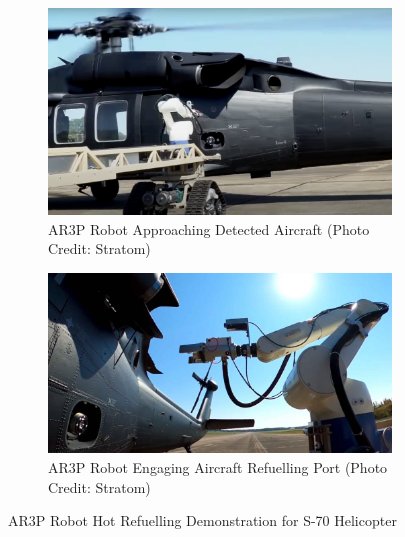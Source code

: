 \documentclass[12pt,oneside]{book} %
\begin{document}
\begin{figure}[H]
    \centering
    \begin{subfigure}[b]{0.45\textwidth}
        \includegraphics[height=0.68\textwidth, width=\textwidth]{figures/test_2020_2.png}
        \caption{AR3P Robot Approaching Detected Aircraft (Photo Credit: Stratom)}\label{test-2020-2}
    \end{subfigure}
    \hfill
    \begin{subfigure}[b]{0.45\textwidth}
        \includegraphics[height=0.68\textwidth, width=\textwidth]{figures/test_2020_3.jpg}
        \caption{AR3P Robot Engaging Aircraft Refuelling Port (Photo Credit: Stratom)}\label{test-2020-3}
    \end{subfigure}
    \caption{AR3P Robot Hot Refuelling Demonstration for S-70 Helicopter}\label{fig:automated-refuelling-systems}
\end{figure}
\end{document}

